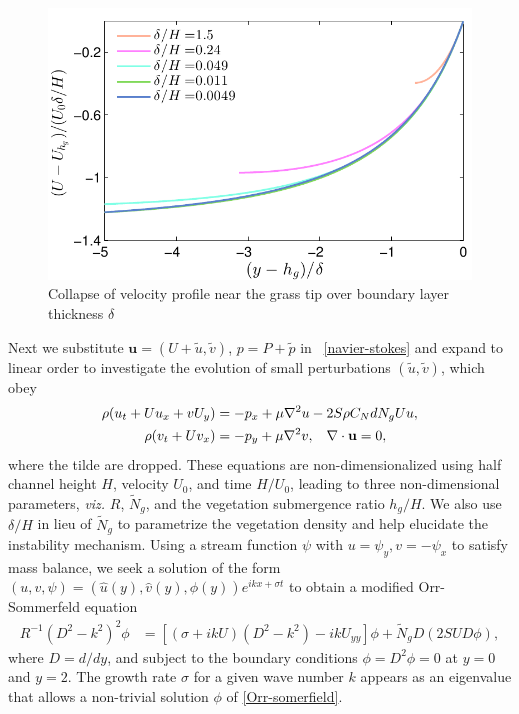 \documentclass[12pt]{report}   %
\newcommand{\bu}{\mathbf{u}}
\newcommand{\hg}{h_g}
\newcommand{\Rey}{{R}}
\newcommand{\Ndg}{\tilde{N}_g}
\begin{document}
\begin{figure}
\centerline{\includegraphics[]{Grass_shear_scale_collapse} }
\caption{
Collapse of velocity profile near the grass tip over boundary layer thickness $\delta$  
}
\label{base_collapse}
\end{figure}

Next we substitute $\bu = (U+\tilde{u}, \tilde{v})$, $p=P+\tilde{p}$ in ~\eqref{navier-stokes} and expand to linear order to investigate the evolution of small perturbations $(\tilde{u}, \tilde{v})$, which obey
\begin{equation}
\begin{split}
\rho(u_t+U u_x+vU_y) &= -p_x+ {\mu}\nabla^2u-2S\rho C_{N}dN_{g}Uu, \\
\rho(v_t+ Uv_x) &= -p_y+ {\mu}\nabla^2v, \hspace{0.3cm} \nabla\cdot\bu=0,
\label{LinearizedNavierStokes}
\end{split} 
\end{equation}
where the tilde are dropped.
These equations are non-dimensionalized using half channel height $H$, velocity $U_0$, and time $H/U_0$, leading to three non-dimensional parameters, \textit{viz.} $\Rey$, $\Ndg$, and the vegetation submergence ratio $\hg/H$. 
We also use $\delta/H$ in lieu of $\Ndg$ to parametrize the vegetation density and help elucidate the instability mechanism. 
Using a stream function $\psi$ with $u = \psi_{y}, v= -\psi_x$ to satisfy mass balance, we seek a solution of 
the form $\left(u,v,\psi \right)= \left(\hat u(y), \hat v(y), \phi(y) \right)e^{ikx+\sigma t}$ to obtain a modified Orr-Sommerfeld equation \cite{Drazin81,Chen97,Chu91} 
\begin{equation}
\begin{split}
\Rey^{-1}\left(D^2 -k^{2} \right)^2\phi &= \left[ \left({\sigma}+ikU\right) \left(D^2-k^2\right) -ikU_{yy}\right]\phi + \Ndg D\left(2 S U D \phi\right),
\label{Orr-somerfield}
\end{split}
\end{equation}
where $D=d/dy$, and subject to the boundary conditions $\phi = D^2\phi = 0$ at $y=0$ and $y=2$. 
The growth rate $\sigma$ for a given wave number $k$ appears as an eigenvalue that allows a non-trivial solution $\phi$ of  \eqref{Orr-somerfield}.
\end{document}
